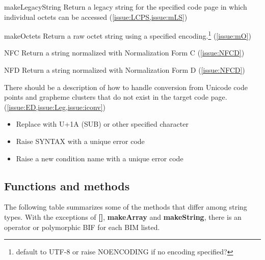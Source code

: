 \documentclass[b4paper]{article}
\begin{document}
\begin{itemize}
\begin{definition}
\item [makeLegacyString]
Return a legacy string for the specified code page in which individual octets can be accessed (\cref{issue:LCPS,issue:mLS})
\item [makeOctets]
Return a raw octet string using a specified encoding.\footnote{default
to UTF-8 or raise NOENCODING if no encoding specified?} (\cref{issue:mO})
\item [NFC] Return a string normalized with Normalization Form C (\cref{issue:NFCD})
\item [NFD] Return a string normalized with Normalization Form D (\cref{issue:NFCD})
\end{definition}
\end{itemize}

There should be a description of how to handle conversion from Unicode code
points and grapheme clusters that do not exist in the target code page.
(\cref{issue:ED,issue:Leg,issue:iconv})
\begin{itemize}
\item Replace with U+1A (SUB) or other specified character
\item Raise SYNTAX with a unique error code
\item Raise a new condition name with a unique error code
\end{itemize}

\subsection{Functions and methods}
The following table summarizes some of the methods that differ among string types. 
With the exceptions of \textbf{{[}{]}}, \textbf{makeArray} and \textbf{makeString},
there is an operator or polymorphic BIF for each BIM listed.
\end{document}
